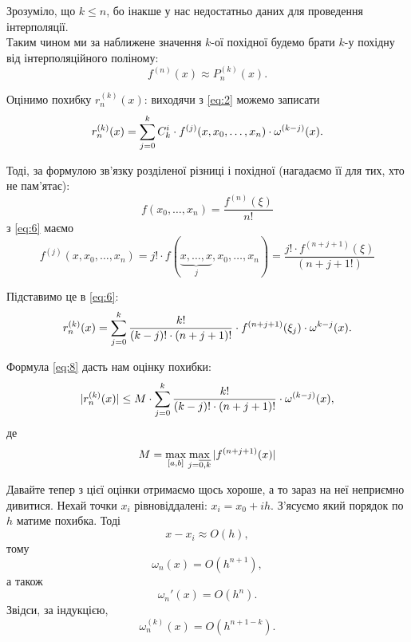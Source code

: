Зрозуміло, що $k \le n$, бо інакше у нас недостатньо даних для проведення інтерполяції. \\

Таким чином ми за наближене значення $k$-ої похідної будемо брати $k$-у похідну від інтерполяційного поліному:
\begin{equation}
	\label{eq:5}
	f^{(n)}(x) \approx P_n^{(k)}(x).
\end{equation}

Оцінимо похибку $r_n^{(k)}(x)$: виходячи з \eqref{eq:2} можемо записати
\begin{equation}
	\label{eq:6}
	r_n^{(k)}(x) = \displaystyle\sum\limits_{j=0}^k C_k^i \cdot f^{(j)} (x, x_0, \ldots, x_n) \cdot \omega^{(k - j)}(x).
\end{equation}

Тоді, за формулою зв'язку розділеної різниці і похідної (нагадаємо її для тих, хто не пам'ятає):
\begin{equation*}
	f(x_0, \ldots , x_n) = \frac{f^{(n)}(\xi)}{n!}
\end{equation*}
з \eqref{eq:6} маємо
\begin{equation}
	\label{eq:7}
	f^{(j)}(x, x_0, \ldots, x_n) = j! \cdot f\left( \underset{j}{\underbrace{x, \ldots, x}}, x_0, \ldots, x_n \right) = \frac{j! \cdot f^{(n + j + 1)}(\xi)}{(n + j + 1!)}
\end{equation}

Підставимо це в \eqref{eq:6}:
\begin{equation}
	\label{eq:8}
	r_n^{(k)}(x) = \displaystyle\sum\limits_{j = 0}^k \frac{k!}{(k-j)! \cdot (n+j+1)!} \cdot f^{(n + j + 1)}(\xi_j) \cdot \omega^{k - j}(x).
\end{equation}

Формула \eqref{eq:8} дасть нам оцінку похибки:
\begin{equation}
	\label{eq:9}
	|r_n^{(k)}(x)| \le M \cdot \displaystyle\sum\limits_{j = 0}^k \frac{k!}{(k-j)! \cdot (n+j+1)!} \cdot \omega^{(k - j)}(x),
\end{equation}
де
\begin{equation*}
	M = \displaystyle\max\limits_{[a,b]} \displaystyle\max\limits_{j = \overline{0, k}} |f^{(n + j + 1)}(x)|
\end{equation*}

Давайте тепер з цієї оцінки отримаємо щось хороше, а то зараз на неї неприємно дивитися. Нехай точки $x_i$ рівновіддалені: $x_i = x_0 + i h$. З'ясуємо який порядок по $h$ матиме похибка. Тоді
\begin{equation*}
	x - x_i \approx O(h),
\end{equation*}
тому
\begin{equation*}
	\omega_n(x) = O(h^{n + 1}),
\end{equation*}
а також 
\begin{equation*}
	\omega_n'(x) = O(h^n).
\end{equation*}
Звідси, за індукцією,
\begin{equation*}
	\omega_n^{(k)}(x) = O(h^{n + 1 - k}).
\end{equation*}

